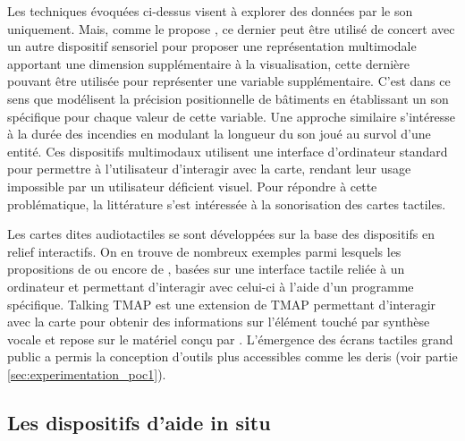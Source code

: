 \newpar{}


Les techniques évoquées ci-dessus visent à explorer des données par le son uniquement. Mais, comme le propose \citet{Krygier1994}, ce dernier peut être utilisé de concert avec un autre dispositif sensoriel pour proposer une représentation multimodale apportant une dimension supplémentaire à la visualisation, cette dernière pouvant être utilisée pour représenter une variable supplémentaire. C'est dans ce sens que \citet{Bearman2010} modélisent la précision positionnelle de bâtiments en établissant un son spécifique pour chaque valeur de cette variable. Une approche similaire \citep{Foteinou2022} s'intéresse à la durée des incendies en modulant la longueur du son joué au survol d'une entité. Ces dispositifs multimodaux utilisent une interface d'ordinateur standard pour permettre à l'utilisateur d'interagir avec la carte, rendant leur usage impossible par un utilisateur déficient visuel. Pour répondre à cette problématique, la littérature s'est intéressée à la sonorisation des cartes tactiles.

\newpar{}


Les cartes dites audiotactiles se sont développées sur la base des dispositifs en relief interactifs. On en trouve de nombreux exemples parmi lesquels les propositions de \citet{Loetzsch1994} ou encore de \citet{Landau2001}, basées sur une interface tactile reliée à un ordinateur et permettant d'interagir avec celui-ci à l'aide d'un programme spécifique.
Talking TMAP \citep{Miele2006} est une extension de TMAP \citep{Miele2004} permettant d'interagir avec la carte pour obtenir des informations sur l'élément touché par synthèse vocale et repose sur le matériel conçu par \citet{Landau2001}. L'émergence des écrans tactiles grand public a permis la conception d'outils plus accessibles comme les \glspl{deri} \citep{Brock2015} (voir partie \ref{sec:experimentation_poc1}).

\subsection{Les dispositifs d'aide in situ}

\label{ea_dispositifs_in_situ}



